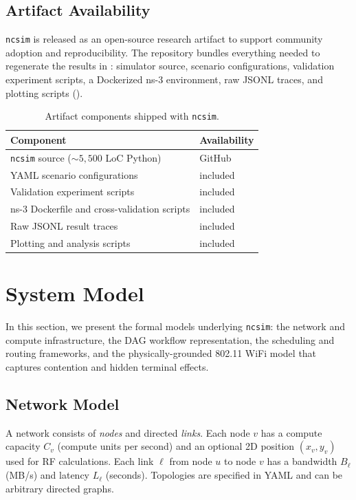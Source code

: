 \documentclass[conference]{IEEEtran}
\newcommand{\ncsim}{\texttt{ncsim}}
\begin{document}
\subsection{Artifact Availability}
\label{sec:artifact}

\ncsim{} is released as an open-source research artifact to support
community adoption and reproducibility.  The repository bundles
everything needed to regenerate the results in
: simulator source, scenario
configurations, validation experiment scripts, a Dockerized ns-3
environment, raw JSONL traces, and plotting scripts
().

\begin{table}[t]
\centering
\caption{Artifact components shipped with \ncsim{}.}
\label{tab:artifact}
\begin{tabular}{@{}lp{4.2cm}@{}}
\toprule
\textbf{Component} & \textbf{Availability} \\
\midrule
\ncsim{} source (${\sim}5{,}500$ LoC Python) & GitHub \\
YAML scenario configurations & included \\
Validation experiment scripts & included \\
ns-3 Dockerfile and cross-validation scripts & included \\
Raw JSONL result traces & included \\
Plotting and analysis scripts & included \\
\bottomrule
\end{tabular}
\end{table}


\section{System Model}
\label{sec:model}

In this section, we present the formal models underlying \ncsim{}: the
network and compute infrastructure, the DAG workflow representation,
the scheduling and routing frameworks, and the physically-grounded
802.11 WiFi model that captures contention and hidden terminal effects.

\subsection{Network Model}

A network consists of \emph{nodes} and directed \emph{links}.  Each node $v$
has a compute capacity $C_v$ (compute units per second) and an optional 2D
position $(x_v, y_v)$ used for RF calculations.  Each link $\ell$ from node
$u$ to node $v$ has a bandwidth $B_\ell$ (MB/s) and latency $L_\ell$
(seconds).  Topologies are specified in YAML and can be arbitrary directed
graphs.
\end{document}
